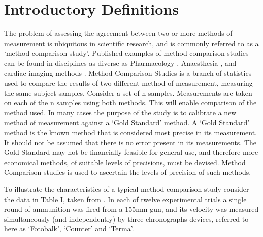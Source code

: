 \documentclass[12pt, a4paper]{report}
\theoremstyle{plain}
\theoremstyle{definition}
\theoremstyle{remark}
\begin{document}
	
	
	
	\section{Introductory Definitions}
	
	
	
	
	The problem of assessing the agreement between two or more methods of measurement is ubiquitous in scientific research, and is commonly referred to as a `method comparison study'. Published examples of method comparison studies can be found in disciplines
	as diverse as Pharmacology \citep{ludbrook97}, Anaesthesia \citep{Myles}, and cardiac imaging methods \citep{Krumm}.
	\smallskip
	Method Comparison Studies is a branch of statistics used to compare the results of two different method of measurement, measuring the same subject samples. Consider a set of n samples. Measurements are taken on each of the n samples using both methods. This will enable comparison of the method used.
	\smallskip
	In many cases the purpose of the study is to calibrate a new method of measurement against a ‘Gold Standard’ method. A ‘Gold Standard’ method is the known method that is considered most precise in its measurement. It should not be assumed that there is no error present in its measurements.
	\smallskip
	The Gold Standard may not be financially feasible for general use, and therefore more economical methods, of suitable levels of precisions, must be devised. Method Comparison studies is used to ascertain the levels of precision of such methods.
	\smallskip
	
	To illustrate the characteristics of a typical method comparison study consider the data in Table I, taken from \citet{Grubbs73}.
	\smallskip
	In each of twelve experimental trials a single round of ammunition was fired from a 155mm gun, and its velocity was measured
	simultaneously (and independently) by three chronographs devices, referred to here as `Fotobalk', `Counter' and `Terma'.
	\smallskip
	
	
	\newpage
	
\end{document}

